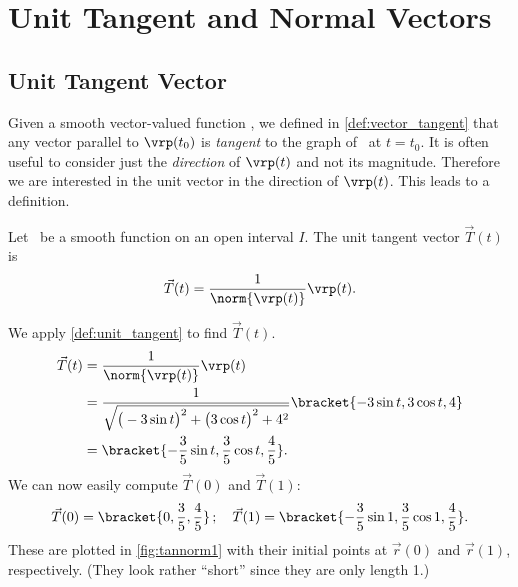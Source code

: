 \section{Unit Tangent and Normal Vectors}\label{sec:tan_norm}

\subsection{Unit Tangent Vector}

Given a smooth vector-valued function \vrt, we defined in \autoref{def:vector_tangent} that any vector parallel to $\vrp(t_0)$ is \emph{tangent} to the graph of \vrt\ at $t=t_0$. It is often useful to consider just the \emph{direction} of $\vrp(t)$ and not its magnitude. Therefore we are interested in the unit vector in the direction of $\vrp(t)$. This leads to a definition.

{Let \vrt\ be a smooth function on an open interval $I$. The unit tangent vector $\vec T(t)$ is
 
\[\vec T(t) = \frac1{\norm{\vrp(t)}}\vrp(t).\]}


{We apply \autoref{def:unit_tangent} to find $\vec T(t)$. 
\begin{align*}
\vec T(t) &= \frac1{\norm{\vrp(t)}}\vrp(t) \\
				&=\frac{1}{\sqrt{\big(-3\sin t\big)^2+\big(3\cos t\big)^2+ 4^2}}\bracket{-3\sin t,3\cos t, 4}\\
				&=\bracket{-\frac35\sin t,\frac35\cos t,\frac45}.
\end{align*}
We can now easily compute $\vec T(0)$ and $\vec T(1)$:
\[\vec T(0) =\bracket{0,\frac35,\frac45}\,;\quad \vec T(1) =\bracket{-\frac35\sin 1,\frac35\cos 1,\frac45}%
.\]
These are plotted in \autoref{fig:tannorm1} with their initial points at $\vec r(0)$ and $\vec r(1)$, respectively. (They look rather ``short'' since they are only length 1.)
%
}

